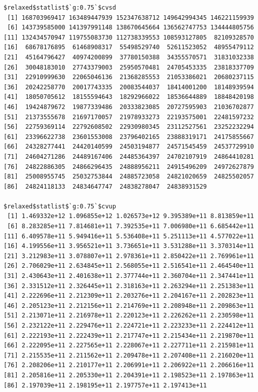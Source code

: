 \documentclass[
]{article}
\begin{document}
\begin{verbatim}
$relaxed$statlist$`g:0.75`$cvsd
 [1] 168703969417 163489447939 152347638712 149642994345 146221159939
 [6] 143739585000 141397991148 138670645664 136562747753 134444805756
[11] 132434570947 119755083730 112738339553 108593127805  82109328570
[16]  68678176895  61468908317  55498529740  52611523052  48955479112
[21]  45164796427  40974200899  37780150388  34355570571  31831032338
[26]  30048183010  27743379003  25950570481  24705453335  23818337709
[31]  22910999630  22065046136  21368285553  21053386021  20680237115
[36]  20242258770  20017743335  20083544037  18414001200  18148939594
[41]  18050705612  18155594643  18292966022  18536644889  18848420198
[46]  19424879672  19877339486  20333823085  20727595903  21036702877
[51]  21373555678  21697170057  21978933273  22193575001  22481597232
[56]  22759369114  22792608502  22930980345  23112527561  23252232294
[61]  23396622738  23601553008  23796402165  23888319171  24175855667
[66]  24328277441  24420140599  24503194877  24571545459  24537729910
[71]  24604271286  24489167406  24485364397  24702107919  24864410281
[76]  24822886305  24866296435  24888956211  24915496209  24972627879
[81]  25008955745  25032753844  24885723058  24821020659  24825502057
[86]  24824118133  24834647747  24838278047  24838931529

$relaxed$statlist$`g:0.75`$cvup
 [1] 1.469332e+12 1.096855e+12 1.026573e+12 9.395389e+11 8.813859e+11
 [6] 8.283285e+11 7.814681e+11 7.392535e+11 7.006980e+11 6.685442e+11
[11] 6.409578e+11 5.949416e+11 5.536408e+11 5.251113e+11 4.577022e+11
[16] 4.199556e+11 3.956521e+11 3.736651e+11 3.531288e+11 3.370314e+11
[21] 3.212983e+11 3.078807e+11 2.978361e+11 2.850422e+11 2.769961e+11
[26] 2.706029e+11 2.634845e+11 2.568055e+11 2.516541e+11 2.464540e+11
[31] 2.430643e+11 2.401638e+11 2.377744e+11 2.360704e+11 2.347441e+11
[36] 2.331512e+11 2.326445e+11 2.318163e+11 2.263294e+11 2.251383e+11
[41] 2.222696e+11 2.212309e+11 2.203276e+11 2.204167e+11 2.202823e+11
[46] 2.205123e+11 2.212156e+11 2.214769e+11 2.208948e+11 2.209863e+11
[51] 2.213071e+11 2.216978e+11 2.220123e+11 2.226262e+11 2.230598e+11
[56] 2.232122e+11 2.229476e+11 2.224721e+11 2.223233e+11 2.224412e+11
[61] 2.222193e+11 2.222439e+11 2.217747e+11 2.215434e+11 2.219870e+11
[66] 2.222095e+11 2.227565e+11 2.228067e+11 2.227711e+11 2.215981e+11
[71] 2.215535e+11 2.211562e+11 2.209478e+11 2.207408e+11 2.216020e+11
[76] 2.208206e+11 2.210177e+11 2.206991e+11 2.206922e+11 2.206616e+11
[81] 2.205816e+11 2.205330e+11 2.204391e+11 2.198523e+11 2.197863e+11
[86] 2.197039e+11 2.198195e+11 2.197757e+11 2.197413e+11


\end{verbatim}
\end{document}

